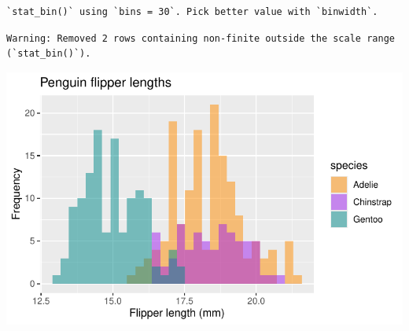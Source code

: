 \documentclass[
  letterpaper,
  DIV=11,
  numbers=noendperiod]{scrreprt}
\begin{document}
\begin{verbatim}
`stat_bin()` using `bins = 30`. Pick better value with `binwidth`.
\end{verbatim}

\begin{verbatim}
Warning: Removed 2 rows containing non-finite outside the scale range
(`stat_bin()`).
\end{verbatim}

\includegraphics{scripts/02_dataViz/class4_files/figure-pdf/unnamed-chunk-9-1.pdf}
\end{document}
